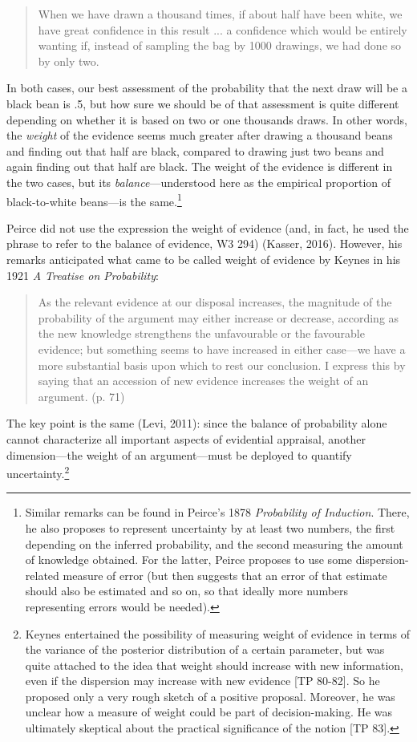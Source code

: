 \documentclass[
  10pt,
  dvipsnames,enabledeprecatedfontcommands]{scrartcl}
\begin{document}
\begin{quote} When we have drawn a thousand times, if about half have been white, we have great confidence in this result ... a confidence which would be entirely wanting if, instead of sampling the bag by 1000 drawings, we had done so by only two.
\end{quote}

\noindent In both cases, our best assessment of the probability that the
next draw will be a black bean is .5, but how sure we should be of that
assessment is quite different depending on whether it is based on two or
one thousands draws. In other words, the \emph{weight} of the evidence
seems much greater after drawing a thousand beans and finding out that
half are black, compared to drawing just two beans and again finding out
that half are black. The weight of the evidence is different in the two
cases, but its \emph{balance}---understood here as the empirical
proportion of black-to-white beans---is the same.\footnote{Similar
  remarks can be found in Peirce's 1878 \emph{Probability of Induction}.
  There, he also proposes to represent uncertainty by at least two
  numbers, the first depending on the inferred probability, and the
  second measuring the amount of knowledge obtained. For the latter,
  Peirce proposes to use some dispersion-related measure of error (but
  then suggests that an error of that estimate should also be estimated
  and so on, so that ideally more numbers representing errors would be
  needed).}

Peirce did not use the expression the weight of evidence (and, in fact,
he used the phrase to refer to the balance of evidence, W3 294) (Kasser,
2016). However, his remarks anticipated what came to be called weight of
evidence by Keynes in his 1921 \emph{A Treatise on Probability}:

\begin{quote}
As the relevant evidence at our disposal increases, the magnitude of the
probability of the argument may either increase or decrease, according as the new knowledge strengthens the unfavourable or the favourable evidence; but something seems to have increased in either case---we have a more substantial basis upon which to rest our conclusion. I express this by saying that an accession of new evidence increases the weight of an argument. (p. 71)
\end{quote}

\noindent The key point is the same (Levi, 2011): since the balance of
probability alone cannot characterize all important aspects of
evidential appraisal, another dimension---the weight of an
argument---must be deployed to quantify uncertainty.\footnote{Keynes
  entertained the possibility of measuring weight of evidence in terms
  of the variance of the posterior distribution of a certain parameter,
  but was quite attached to the idea that weight should increase with
  new information, even if the dispersion may increase with new evidence
  {[}TP 80-82{]}. So he proposed only a very rough sketch of a positive
  proposal. Moreover, he was unclear how a measure of weight could be
  part of decision-making. He was ultimately skeptical about the
  practical significance of the notion {[}TP 83{]}.}
\end{document}
